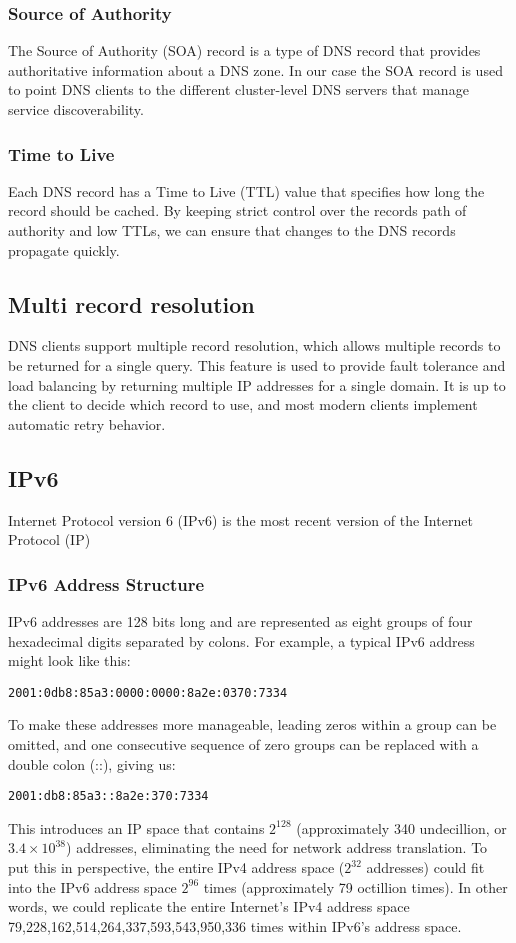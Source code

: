 \documentclass[12pt]{article}
\begin{document}
\subsubsection{Source of Authority}
The Source of Authority (SOA) record is a type of DNS record that provides authoritative information about a DNS zone.
In our case the SOA record is used to point DNS clients to the different cluster-level DNS servers that manage service discoverability.

\subsubsection{Time to Live}
Each DNS record has a Time to Live (TTL) value that specifies how long the record should be cached.
By keeping strict control over the records path of authority and low TTLs, we can ensure that changes to the DNS records propagate quickly.

\subsection{Multi record resolution}
DNS clients support multiple record resolution, which allows multiple records to be returned for a single query.
This feature is used to provide fault tolerance and load balancing by returning multiple IP addresses for a single domain.
It is up to the client to decide which record to use, and most modern clients implement automatic retry behavior.

\subsection{IPv6}
Internet Protocol version 6 (IPv6)\cite{hindenInternetProtocolVersion1998} is the most recent version of the Internet Protocol (IP)
\subsubsection{IPv6 Address Structure}
IPv6 addresses are 128 bits long and are represented as eight groups of four hexadecimal digits separated by colons.
For example, a typical IPv6 address might look like this:
\begin{verbatim}
2001:0db8:85a3:0000:0000:8a2e:0370:7334
\end{verbatim}
To make these addresses more manageable, leading zeros within a group can be omitted, 
and one consecutive sequence of zero groups can be replaced with a double colon (::), giving us:
\begin{verbatim}
2001:db8:85a3::8a2e:370:7334
\end{verbatim}
This introduces an IP space that contains $2^{128}$ (approximately 340 undecillion, or $3.4 \times 10^{38}$) addresses, 
eliminating the need for network address translation. 
To put this in perspective, the entire IPv4 address space ($2^{32}$ addresses) could fit into the IPv6 address space $2^{96}$ times 
(approximately 79 octillion times).
In other words, we could replicate the entire Internet's IPv4 address space 79,228,162,514,264,337,593,543,950,336 times within IPv6's address space.
\end{document}
